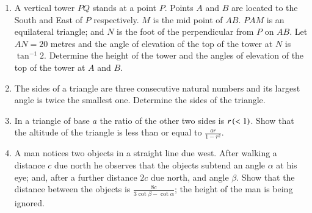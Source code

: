 \documentclass[journal,12pt,twocolumn]{IEEEtran}
\theoremstyle{remark}
\begin{document}
\begin{enumerate}
\hfill{}

\item A vertical tower $PQ$ stands at a point $P$. Points $A$ and $B$ are located to the South and East of $P$ respectively. $M$ is the mid point of $AB$. $PAM$ is an equilateral triangle; and $N$ is the foot of the perpendicular from $P$ on $AB$. Let $AN=20$ metres and the angle of elevation of the top of the tower at $N$ is $\tan^{-1}{2}$. Determine the height of the tower and the angles of elevation of the top of the tower at $A$ and $B$.

\hfill{}

\item The sides of a triangle are three consecutive natural numbers and its largest angle is twice the smallest one. Determine the sides of the triangle.

\hfill{}

\item In a triangle of base $a$ the ratio of the other two sides is $r\left(<1\right)$. Show that the altitude of the triangle is less than or equal to $\frac{ar}{1-r^2}$.

\hfill{}

\item A man notices two objects in a straight line due west. After walking a distance $c$ due north he observes that the objects subtend an angle $\alpha$ at his eye; and, after a further distance $2c$ due north, and angle $\beta$. Show that the distance between the objects is $\frac{8c}{3\cot{\beta}-\cot{\alpha}}$; the height of the man is being ignored. 

\hfill{}

\end{enumerate}
\end{document}
